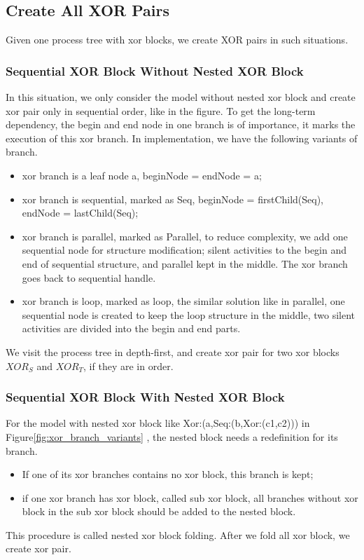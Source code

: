 \documentclass[]{article}
\begin{document}
\subsection{Create All XOR Pairs}
Given one process tree with xor blocks, we create XOR pairs in such situations. 
\subsubsection{Sequential XOR Block Without Nested XOR Block}
In this situation, we only consider the model without nested xor block and create xor pair only in sequential order, like in the figure.
To get the long-term dependency, the begin and end node in one branch is of importance, it marks the execution of this xor branch. In implementation, we have the following variants of branch. 
\begin{itemize}
	\item xor branch is a leaf node a, beginNode = endNode = a;
	\item xor branch is sequential, marked as Seq, beginNode = firstChild(Seq), endNode = lastChild(Seq);
	\item xor branch is parallel, marked as Parallel, to reduce complexity, we add one sequential node for structure modification; silent activities to the begin and end of sequential structure, and parallel kept in the middle. The xor branch goes back to sequential handle.
	\item xor branch is loop, marked as loop, the similar solution like in parallel, one sequential node is created to keep the loop structure in the middle, two silent activities are divided into the begin and end parts.
\end{itemize}
We visit the process tree in depth-first, and create xor pair for two xor blocks $XOR_S$ and $XOR_T$, if they are in order.
\subsubsection{ Sequential XOR Block With Nested XOR Block}
For the model with nested xor block like Xor:(a,Seq:(b,Xor:(c1,c2))) in Figure\ref{fig:xor_branch_variants} , the nested block needs a redefinition for its branch. 
\begin{itemize}
	\item If one of its xor branches contains no xor block, this branch is kept;
	\item if one xor branch has xor block, called sub xor block, all branches without xor block in the sub xor block should be added to the nested block.  
\end{itemize}
This procedure is called nested xor block folding. After we fold all xor block, we create xor pair.  	
\end{document}
